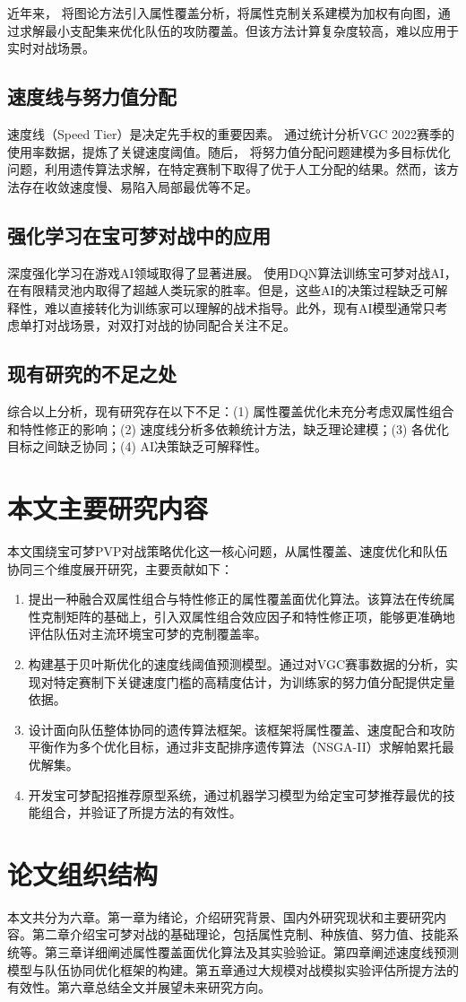 近年来，\citet{betts2005aging} 将图论方法引入属性覆盖分析，将属性克制关系建模为加权有向图，通过求解最小支配集来优化队伍的攻防覆盖。但该方法计算复杂度较高，难以应用于实时对战场景。

\subsection{速度线与努力值分配}

速度线（Speed Tier）是决定先手权的重要因素。\citet{chu2004tushu} 通过统计分析VGC 2022赛季的使用率数据，提炼了关键速度阈值。随后，\citet{walls2013drought} 将努力值分配问题建模为多目标优化问题，利用遗传算法求解，在特定赛制下取得了优于人工分配的结果。然而，该方法存在收敛速度慢、易陷入局部最优等不足。

\subsection{强化学习在宝可梦对战中的应用}

深度强化学习在游戏AI领域取得了显著进展。\citet{hls2012jinji} 使用DQN算法训练宝可梦对战AI，在有限精灵池内取得了超越人类玩家的胜率。但是，这些AI的决策过程缺乏可解释性，难以直接转化为训练家可以理解的战术指导。此外，现有AI模型通常只考虑单打对战场景，对双打对战的协同配合关注不足。

\subsection{现有研究的不足之处}

综合以上分析，现有研究存在以下不足：(1) 属性覆盖优化未充分考虑双属性组合和特性修正的影响；(2) 速度线分析多依赖统计方法，缺乏理论建模；(3) 各优化目标之间缺乏协同；(4) AI决策缺乏可解释性。

\section{本文主要研究内容}

本文围绕宝可梦PVP对战策略优化这一核心问题，从属性覆盖、速度优化和队伍协同三个维度展开研究，主要贡献如下：

\begin{enumerate}
    \item 提出一种融合双属性组合与特性修正的属性覆盖面优化算法。该算法在传统属性克制矩阵的基础上，引入双属性组合效应因子和特性修正项，能够更准确地评估队伍对主流环境宝可梦的克制覆盖率。
    \item 构建基于贝叶斯优化的速度线阈值预测模型。通过对VGC赛事数据的分析，实现对特定赛制下关键速度门槛的高精度估计，为训练家的努力值分配提供定量依据。
    \item 设计面向队伍整体协同的遗传算法框架。该框架将属性覆盖、速度配合和攻防平衡作为多个优化目标，通过非支配排序遗传算法（NSGA-II）求解帕累托最优解集。
    \item 开发宝可梦配招推荐原型系统，通过机器学习模型为给定宝可梦推荐最优的技能组合，并验证了所提方法的有效性。
\end{enumerate}

\section{论文组织结构}

本文共分为六章。第一章为绪论，介绍研究背景、国内外研究现状和主要研究内容。第二章介绍宝可梦对战的基础理论，包括属性克制、种族值、努力值、技能系统等。第三章详细阐述属性覆盖面优化算法及其实验验证。第四章阐述速度线预测模型与队伍协同优化框架的构建。第五章通过大规模对战模拟实验评估所提方法的有效性。第六章总结全文并展望未来研究方向。
